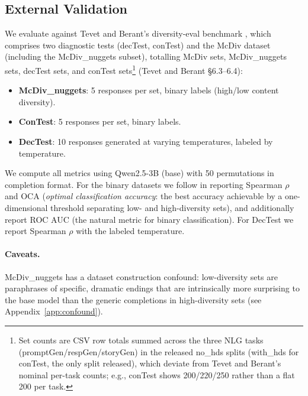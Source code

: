 \subsection{External Validation}\label{sec:tevet}

We evaluate against Tevet and Berant's diversity-eval benchmark \citep{tevet2020evaluating}, which comprises two diagnostic tests (decTest, conTest) and the McDiv dataset (including the McDiv\_nuggets subset), totalling \tevetMcDivSetCount{} McDiv sets, \tevetMcDivNugSetCount{} McDiv\_nuggets sets, \tevetDecTestSetCount{} decTest sets, and \tevetConTestSetCount{} conTest sets\footnote{Set counts are CSV row totals summed across the three NLG tasks (promptGen/respGen/storyGen) in the released no\_hds splits (with\_hds for conTest, the only split released), which deviate from Tevet and Berant's nominal per-task counts; e.g., conTest shows 200/220/250 rather than a flat 200 per task.} (Tevet and Berant \S6.3--6.4):
\begin{itemize}[nosep]
    \item \textbf{McDiv\_nuggets}: 5 responses per set, binary labels (high/low content diversity).
    \item \textbf{ConTest}: 5 responses per set, binary labels.
    \item \textbf{DecTest}: 10 responses generated at varying temperatures, labeled by temperature.
\end{itemize}
We compute all metrics using Qwen2.5-3B (base) with 50 permutations in completion format.
For the binary datasets we follow \citet{tevet2020evaluating} in reporting Spearman $\rho$ and OCA (\emph{optimal classification accuracy}: the best accuracy achievable by a one-dimensional threshold separating low- and high-diversity sets), and additionally report ROC AUC (the natural metric for binary classification).
For DecTest we report Spearman $\rho$ with the labeled temperature.

\paragraph{Caveats.} McDiv\_nuggets has a dataset construction confound: low-diversity sets are paraphrases of specific, dramatic endings that are intrinsically more surprising to the base model than the generic completions in high-diversity sets (see Appendix~\ref{app:confound}).


